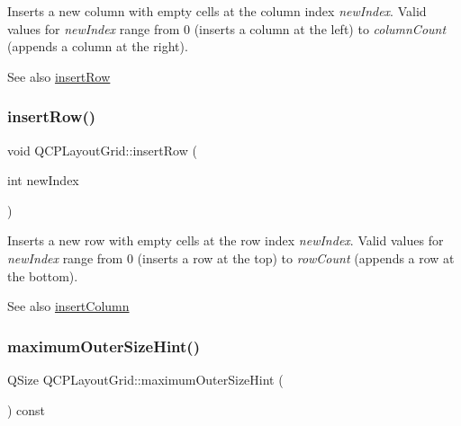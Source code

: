 Inserts a new column with empty cells at the column index {\itshape new\+Index}. Valid values for {\itshape new\+Index} range from 0 (inserts a column at the left) to {\itshape column\+Count} (appends a column at the right).

\begin{DoxySeeAlso}{See also}
\mbox{\hyperlink{class_q_c_p_layout_grid_a48af3dd7c3a653d9c3d7dd99bd02e838}{insert\+Row}} 
\end{DoxySeeAlso}
\mbox{\label{class_q_c_p_layout_grid_a48af3dd7c3a653d9c3d7dd99bd02e838}} 
\subsubsection{\texorpdfstring{insertRow()}{insertRow()}}
{\footnotesize\ttfamily void Q\+C\+P\+Layout\+Grid\+::insert\+Row (\begin{DoxyParamCaption}\item[{int}]{new\+Index }\end{DoxyParamCaption})}

Inserts a new row with empty cells at the row index {\itshape new\+Index}. Valid values for {\itshape new\+Index} range from 0 (inserts a row at the top) to {\itshape row\+Count} (appends a row at the bottom).

\begin{DoxySeeAlso}{See also}
\mbox{\hyperlink{class_q_c_p_layout_grid_a1e880a321dbe8b43b471ccd764433dc4}{insert\+Column}} 
\end{DoxySeeAlso}
\mbox{\label{class_q_c_p_layout_grid_a41ce0014c220d77b909e2ca937f0e599}} 
\subsubsection{\texorpdfstring{maximumOuterSizeHint()}{maximumOuterSizeHint()}}
{\footnotesize\ttfamily Q\+Size Q\+C\+P\+Layout\+Grid\+::maximum\+Outer\+Size\+Hint (\begin{DoxyParamCaption}{ }\end{DoxyParamCaption}) const\hspace{0.3cm}{\ttfamily [virtual]}}

